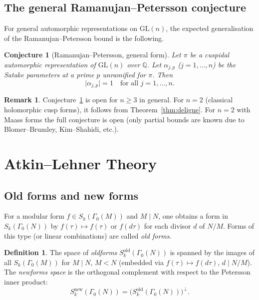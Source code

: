 \documentclass[12pt,a4paper]{amsart}
\newtheorem{conjecture}[theorem]{Conjecture}
\theoremstyle{definition}
\newtheorem{definition}[theorem]{Definition}
\newtheorem{remark}[theorem]{Remark}
\begin{document}
\subsection{The general Ramanujan--Petersson conjecture}

For general automorphic representations on $\mathrm{GL}(n)$, the expected
generalisation of the Ramanujan--Petersson bound is the following.

\begin{conjecture}[Ramanujan--Petersson, general form]\label{conj:rp-general}
  Let $\pi$ be a cuspidal automorphic representation of $\mathrm{GL}(n)$ over $\mathbb{Q}$.
  Let $\alpha_{j,p}$ ($j = 1,\ldots,n$) be the Satake parameters at a prime $p$
  unramified for $\pi$. Then
  \[
    \lvert \alpha_{j,p} \rvert = 1 \quad \text{for all } j = 1,\ldots,n.
  \]
\end{conjecture}

\begin{remark}
  Conjecture~\ref{conj:rp-general} is open for $n \ge 3$ in general.
  For $n=2$ (classical holomorphic cusp forms), it follows from Theorem~\ref{thm:deligne}.
  For $n=2$ with Maass forms the full conjecture is open (only partial bounds
  are known due to Blomer--Brumley, Kim--Shahidi, etc.).
\end{remark}

\section{Atkin--Lehner Theory}

\subsection{Old forms and new forms}

For a modular form $f \in S_k(\Gamma_0(M))$ and $M \mid N$, one obtains
a form in $S_k(\Gamma_0(N))$ by $f(\tau) \mapsto f(\tau)$ or $f(d\tau)$
for each divisor $d$ of $N/M$. Forms of this type (or linear combinations)
are called \emph{old forms}.

\begin{definition}
  The space of \emph{oldforms} $S_k^{\mathrm{old}}(\Gamma_0(N))$ is spanned by the
  images of all $S_k(\Gamma_0(M))$ for $M \mid N$, $M < N$ (embedded via
  $f(\tau) \mapsto f(d\tau)$, $d \mid N/M$). The \emph{newforms space}
  is the orthogonal complement with respect to the Petersson inner product:
  \[
    S_k^{\mathrm{new}}(\Gamma_0(N)) = \bigl(S_k^{\mathrm{old}}(\Gamma_0(N))\bigr)^{\perp}.
  \]
\end{definition}
\end{document}
